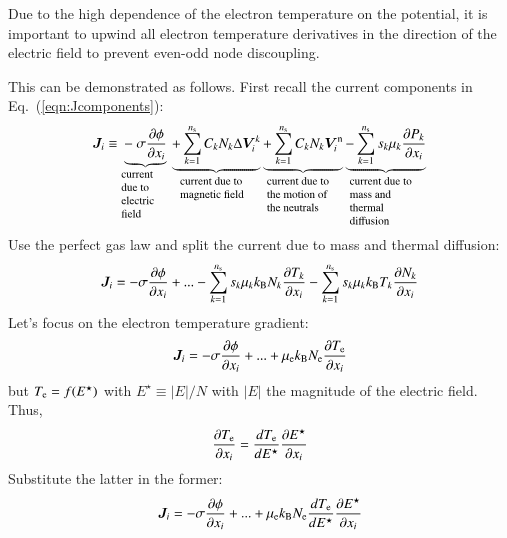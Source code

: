 \documentclass{warpdoc}
\newcommand{\ns}{{n_{\rm s}}}
\renewcommand{\vec}[1]{\bm{#1}}
\begin{document}
 Due to the high dependence of the electron temperature on the potential, it is important to upwind all electron temperature derivatives in the direction of the electric field to prevent even-odd node discoupling. 

This can be demonstrated as follows. First recall the current components in Eq.\ (\ref{eqn:Jcomponents}):
%
\begin{equation}
 \vec{J}_i \equiv 
  \underbrace{-~\sigma\frac{\partial \phi}{\partial x_i}}_{\begin{minipage}{0.1\textwidth}\footnotesize\flushleft current due to electric field \end{minipage}}
\underbrace{+ \sum_{k=1}^\ns C_k N_k \Delta \vec{V}^k_i}_{\begin{minipage}{0.15\textwidth}\footnotesize\flushleft current due to magnetic field \end{minipage}}
\underbrace{+ \sum_{k=1}^\ns C_k N_k \vec{V}^{\rm n}_i}_{\begin{minipage}{0.15\textwidth}\footnotesize\flushleft current due to the motion of the neutrals \end{minipage}}
\underbrace{- \sum_{k=1}^\ns {s_k \mu_k} \frac{\partial P_k}{\partial x_i} }_{\begin{minipage}{0.15\textwidth}\footnotesize\flushleft current due to mass and thermal diffusion \end{minipage}}
\end{equation}
%
Use the perfect gas law and split the current due to mass and thermal diffusion:
%
\begin{equation}
 \vec{J}_i = 
- \sigma\frac{\partial \phi}{\partial x_i}
+ ...
- \sum_{k=1}^\ns s_k \mu_k k_{\rm B} N_k \frac{\partial T_k}{\partial x_i} 
- \sum_{k=1}^\ns s_k \mu_k k_{\rm B} T_k \frac{\partial N_k}{\partial x_i} 
\end{equation}
%
Let's focus on the electron temperature gradient:
%
\begin{equation}
 \vec{J}_i = 
- \sigma\frac{\partial \phi}{\partial x_i}
+ ...
+ \mu_{\rm e} k_{\rm B} N_{\rm e} \frac{\partial T_{\rm e}}{\partial x_i} 
\end{equation}
%
but $T_{\rm e}=f(E^\star)$ with $E^\star\equiv |E|/N$ with $|E|$ the magnitude of the electric field. Thus,
%
\begin{equation}
  \frac{\partial T_{\rm e}}{\partial x_i}=\frac{d T_{\rm e}}{d E^\star}\frac{\partial E^\star}{\partial x_i}
\end{equation}
% 
Substitute the latter in the former:
%
\begin{equation}
 \vec{J}_i = 
- \sigma\frac{\partial \phi}{\partial x_i}
+ ...
+ \mu_{\rm e} k_{\rm B} N_{\rm e} \frac{d T_{\rm e}}{d E^\star}\frac{\partial E^\star}{\partial x_i}
\end{equation}
\end{document}
